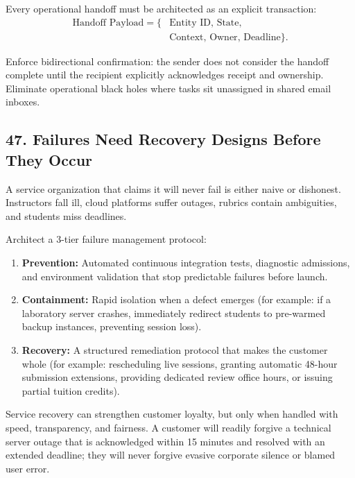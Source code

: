 Every operational handoff must be architected as an explicit transaction:
\begin{equation}
\begin{aligned}
\text{Handoff Payload} = \{ &\text{Entity ID},\, \text{State}, \\
&\text{Context},\, \text{Owner},\, \text{Deadline} \}.
\end{aligned}
\end{equation}

Enforce bidirectional confirmation: the sender does not consider the handoff complete until the recipient explicitly acknowledges receipt and ownership. Eliminate operational black holes where tasks sit unassigned in shared email inboxes.

\subsection*{47. Failures Need Recovery Designs Before They Occur}

A service organization that claims it will never fail is either naive or dishonest. Instructors fall ill, cloud platforms suffer outages, rubrics contain ambiguities, and students miss deadlines.

Architect a 3-tier failure management protocol:
\begin{enumerate}
    \item \textbf{Prevention:} Automated continuous integration tests, diagnostic admissions, and environment validation that stop predictable failures before launch.
    \item \textbf{Containment:} Rapid isolation when a defect emerges (for example: if a laboratory server crashes, immediately redirect students to pre-warmed backup instances, preventing session loss).
    \item \textbf{Recovery:} A structured remediation protocol that makes the customer whole (for example: rescheduling live sessions, granting automatic 48-hour submission extensions, providing dedicated review office hours, or issuing partial tuition credits).
\end{enumerate}

Service recovery can strengthen customer loyalty, but only when handled with speed, transparency, and fairness. A customer will readily forgive a technical server outage that is acknowledged within 15 minutes and resolved with an extended deadline; they will never forgive evasive corporate silence or blamed user error.

